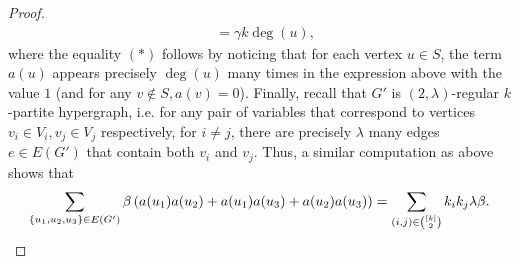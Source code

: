 \documentclass[a4paper,UKenglish,cleveref, autoref, thm-restate,numberwithinsect]{lipics-v2021}
\begin{document}
\begin{proof}
\begin{align*}
        &= \gamma k\deg(u),
    \end{align*}
    where the equality $(*)$ follows by noticing that for each vertex $u\in S$, the term $a(u)$ appears precisely $\deg(u)$ many times in the expression above with the value $1$ (and for any $v\not\in S, a(v)=0$).
    Finally, recall that $G'$ is $(2,\lambda)$-regular $k$-partite hypergraph, i.e.
for any pair of variables that correspond to vertices $v_i\in V_i, v_j\in V_j$ respectively, for $i\neq j$, there are precisely $\lambda$ many edges $e\in E(G')$ that contain both $v_i$ and $v_j$. 
    Thus, a similar computation as above shows that 
    \[
    \sum_{\{u_1,u_2,u_3\}\in E(G')}\beta \left(a(u_1)a(u_2)+a(u_1)a(u_3)+a(u_2)a(u_3)\right) = \sum_{(i,j)\in \binom{[k]}{2}}k_ik_j\lambda \beta. \qedhere
    \]
\end{proof}
\end{document}
